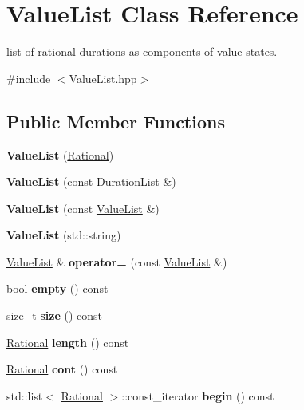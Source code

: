 \hypertarget{classValueList}{}\section{Value\+List Class Reference}
\label{classValueList}


list of rational durations as components of value states.  




{\ttfamily \#include $<$Value\+List.\+hpp$>$}

\subsection*{Public Member Functions}
\begin{DoxyCompactItemize}
\item 
{\bfseries Value\+List} (\mbox{\hyperlink{classRational}{Rational}})
\item 
{\bfseries Value\+List} (const \mbox{\hyperlink{classDurationList}{Duration\+List}} \&)
\item 
{\bfseries Value\+List} (const \mbox{\hyperlink{classValueList}{Value\+List}} \&)
\item 
{\bfseries Value\+List} (std\+::string)
\item 
\mbox{\hyperlink{classValueList}{Value\+List}} \& {\bfseries operator=} (const \mbox{\hyperlink{classValueList}{Value\+List}} \&)
\item 
bool {\bfseries empty} () const
\item 
\mbox{\label{classValueList_a21c3cca5483e25f27cadb7ae82d2dd96}} 
size\+\_\+t {\bfseries size} () const
\item 
\mbox{\label{classValueList_a1a24053a2e70a12da2af6680b594d03b}} 
\mbox{\hyperlink{classRational}{Rational}} {\bfseries length} () const
\item 
\mbox{\label{classValueList_a3d7f406dd34ed78e0f12324075ee2c8b}} 
\mbox{\hyperlink{classRational}{Rational}} {\bfseries cont} () const
\item 
\mbox{\label{classValueList_af5e02ab5d58c4c9196a23473d55e7ae9}} 
std\+::list$<$ \mbox{\hyperlink{classRational}{Rational}} $>$\+::const\+\_\+iterator {\bfseries begin} () const
\item 
\mbox{\label{classValueList_abd03430257070988728b597fa1467353}} 

\end{DoxyCompactItemize}
